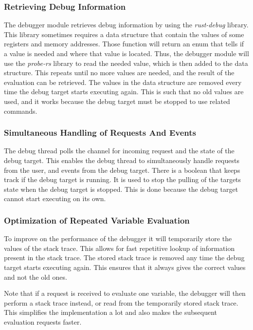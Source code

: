 \subsubsection{Retrieving Debug Information} %
The debugger module retrieves debug information by using the \emph{rust-debug} library.
This library sometimes requires a data structure that contain the values of some registers and memory addresses.
Those function will return an enum that tells if a value is needed and where that value is located.
Thus, the debugger module will use the \emph{probe-rs} library to read the needed value, which is then added to the data structure.
This repeats until no more values are needed, and the result of the evaluation can be retrieved.
The values in the data structure are removed every time the debug target starts executing again.
This is such that no old values are used, and it works because the debug target must be stopped to use related commands.



\subsubsection{Simultaneous Handling of Requests And Events} %
The debug thread polls the channel for incoming request and the state of the debug target.
This enables the debug thread to simultaneously handle requests from the user, and events from the debug target.
There is a boolean that keeps track if the debug target is running.
It is used to stop the pulling of the targets state when the debug target is stopped.
This is done because the debug target cannot start executing on its own.


\subsubsection{Optimization of Repeated Variable Evaluation} %
To improve on the performance of the debugger it will temporarily store the values of the stack trace.
This allows for fast repetitive lookup of information present in the stack trace.
The stored stack trace is removed any time the debug target starts executing again.
This ensures that it always gives the correct values and not the old ones.


Note that if a request is received to evaluate one variable, the debugger will then perform a stack trace instead, or read from the temporarily stored stack trace.
This simplifies the implementation a lot and also makes the subsequent evaluation requests faster.


